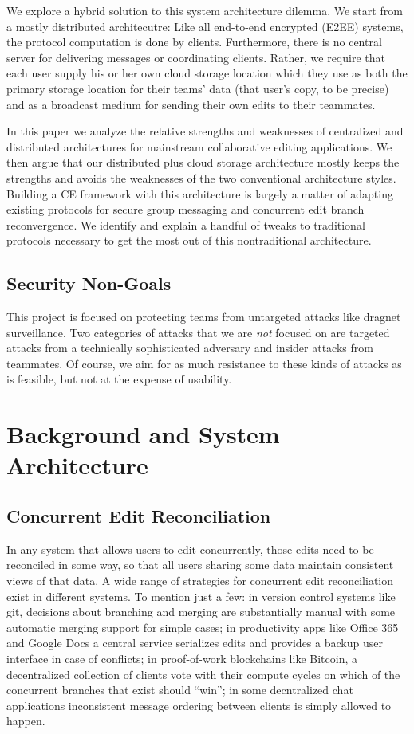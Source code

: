\documentclass[runningheads]{llncs}
\begin{document}
We explore a hybrid solution to this system architecture dilemma.
We start from a mostly distributed architecutre: Like all end-to-end encrypted (E2EE) systems, the protocol computation is done by clients.
Furthermore, there is no central server for delivering messages or coordinating clients.
Rather, we require that each user supply his or her own cloud storage location which they use as both the primary storage location for their teams' data (that user's copy, to be precise) and as a broadcast medium for sending their own edits to their teammates.

In this paper we analyze the relative strengths and weaknesses of centralized and distributed architectures for mainstream collaborative editing applications.
We then argue that our distributed plus cloud storage architecture mostly keeps the strengths and avoids the weaknesses of the two conventional architecture styles.
Building a CE framework with this architecture is largely a matter of adapting existing protocols for secure group messaging and concurrent edit branch reconvergence.
We identify and explain a handful of tweaks to traditional protocols necessary to get the most out of this nontraditional architecture.

\subsection{Security Non-Goals}

This project is focused on protecting teams from untargeted attacks like dragnet surveillance.
Two categories of attacks that we are \emph{not} focused on are targeted attacks from a technically sophisticated adversary and insider attacks from teammates.
Of course, we aim for as much resistance to these kinds of attacks as is feasible, but not at the expense of usability.

\section{Background and System Architecture}

\subsection{Concurrent Edit Reconciliation}

In any system that allows users to edit concurrently, those edits need to be reconciled in some way, so that all users sharing some data maintain consistent views of that data.
A wide range of strategies for concurrent edit reconciliation exist in different systems.
To mention just a few: in version control systems like git, decisions about branching and merging are substantially manual with some automatic merging support for simple cases; in productivity apps like Office 365 and Google Docs a central service serializes edits and provides a backup user interface in case of conflicts; in proof-of-work blockchains like Bitcoin, a decentralized collection of clients vote with their compute cycles on which of the concurrent branches that exist should ``win''; in some decntralized chat applications inconsistent message ordering between clients is simply allowed to happen.
\end{document}
